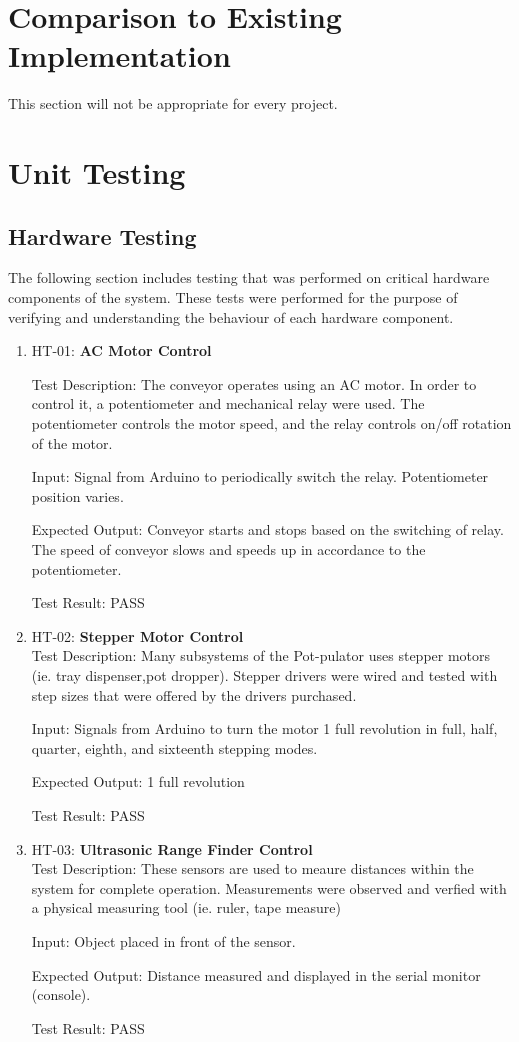 \documentclass[12pt, titlepage]{article}
\begin{document}
\section{Comparison to Existing Implementation}	

This section will not be appropriate for every project.

\section{Unit Testing}

  \subsection{Hardware Testing}
  The following section includes testing that was performed on critical hardware components
  of the system. These tests were performed for the purpose of verifying and understanding the  
  behaviour of each hardware component.
  \begin{enumerate}
  \item{HT-01: \textbf{AC Motor Control}}
  
  Test Description: The conveyor operates using an AC motor. In order to control it,
  a potentiometer and mechanical relay were used. The potentiometer controls the motor speed,
  and the relay controls on/off rotation of the motor.

  Input: Signal from Arduino to periodically switch the relay. Potentiometer position varies.

  Expected Output: Conveyor starts and stops based on the switching of relay. The speed of conveyor slows and speeds up
  in accordance to the potentiometer.

  Test Result: PASS
  \\
  \item{HT-02: \textbf{Stepper Motor Control}}\\
  Test Description: Many subsystems of the Pot-pulator uses stepper motors (ie. tray dispenser,pot dropper).
   Stepper drivers were wired and tested with step sizes that were offered by 
   the drivers purchased. 

  Input: Signals from Arduino to turn the motor 1 full revolution in full, half, quarter,
  eighth, and sixteenth stepping modes.

  Expected Output: 1 full revolution

  Test Result: PASS
  \\
  \item{HT-03: \textbf{Ultrasonic Range Finder Control}}\\
  Test Description: These sensors are used to meaure distances within the system for complete
  operation. Measurements were observed and verfied with a physical measuring tool (ie. ruler, tape measure)

  Input: Object placed in front of the sensor.

  Expected Output: Distance measured and displayed in the serial monitor (console).

  Test Result: PASS
\end{enumerate}
\end{document}
